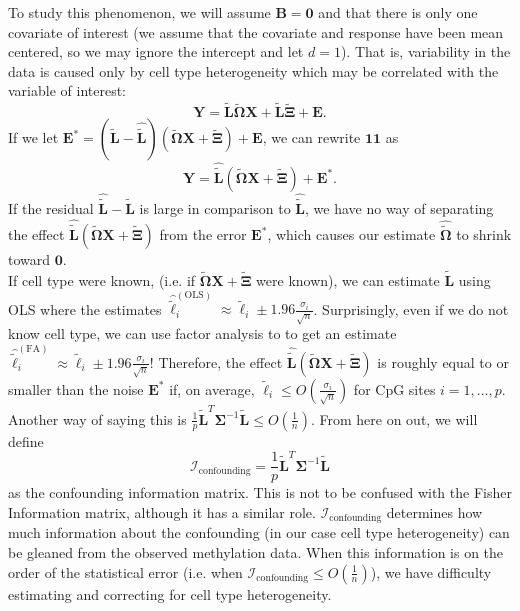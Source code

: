 \documentclass{article}
\begin{document}
\indent To study this phenomenon, we will assume $\bm{B} = \bm{0}$ and that there is only one covariate of interest (we assume that the covariate and response have been mean centered, so we may ignore the intercept and let $d=1$). That is, variability in the data is caused only by cell type heterogeneity which may be correlated with the variable of interest:
\begin{equation}
\bm{Y} = \tilde{\bm{L}}\tilde{\bm{\Omega}}\bm{X} + \tilde{\bm{L}}\tilde{\bm{\Xi}} + \bm{E}.
\end{equation}
If we let $\bm{E}^* = \left( \tilde{\bm{L}} - \hat{\tilde{\bm{L}}} \right) \left(\tilde{\bm{\Omega}}\bm{X} + \tilde{\bm{\Xi}} \right) +  \bm{E}$, we can rewrite $\bm{11}$ as
\begin{equation}
\bm{Y} = \hat{\tilde{\bm{L}}}\left(\tilde{\bm{\Omega}}\bm{X} + \tilde{\bm{\Xi}} \right) + \bm{E}^*.
\end{equation} 
If the residual $\hat{\bm{\tilde{L}}} - \bm{\tilde{L}}$ is large in comparison to $\hat{\tilde{\bm{L}}}$, we have no way of separating the effect $\hat{\tilde{\bm{L}}}\left(\tilde{\bm{\Omega}}\bm{X} + \tilde{\bm{\Xi}} \right)$ from the error $\bm{E}^*$, which causes our estimate $\hat{\tilde{\bm{\Omega}}}$ to shrink toward $\bm{0}$.\\
\indent If cell type were known, (i.e. if $\tilde{\bm{\Omega}}\bm{X} + \tilde{\bm{\Xi}}$ were known), we can estimate $\tilde{\bm{L}}$ using OLS where the estimates $\hat{\tilde{\bm{\ell}}}_i^{(\text{OLS})} \approx \tilde{\bm{\ell}}_i \pm 1.96\frac{\sigma_i}{\sqrt{n}}$. Surprisingly, even if we do not know cell type, we can use factor analysis to to get an estimate $\hat{\tilde{\bm{\ell}}}_i^{(\text{FA})} \approx \tilde{\bm{\ell}}_i \pm 1.96\frac{\sigma_i}{\sqrt{n}}$! Therefore, the effect $\hat{\tilde{\bm{L}}}\left(\tilde{\bm{\Omega}}\bm{X} + \tilde{\bm{\Xi}} \right)$ is roughly equal to or smaller than the noise $\bm{E}^*$ if, on average, $\tilde{\bm{\ell}}_i \leq O\left( \frac{\sigma_i}{\sqrt{n}} \right)$ for CpG sites $i = 1, \ldots, p$. Another way of saying this is $\frac{1}{p}\tilde{\bm{L}}^T \bm{\Sigma}^{-1}\tilde{\bm{L}} \leq O\left( \frac{1}{n} \right)$. From here on out, we will define
\begin{equation}
\mathcal{I}_{\text{confounding}} = \frac{1}{p}\tilde{\bm{L}}^T \bm{\Sigma}^{-1}\tilde{\bm{L}}
\end{equation}
as the confounding information matrix. This is not to be confused with the Fisher Information matrix, although it has a similar role. $\mathcal{I}_{\text{confounding}}$ determines how much information about the confounding (in our case cell type heterogeneity) can be gleaned from the observed methylation data. When this information is on the order of the statistical error (i.e. when $\mathcal{I}_{\text{confounding}} \leq O\left( \frac{1}{n} \right)$), we have difficulty estimating and correcting for cell type heterogeneity.\\
\end{document}
